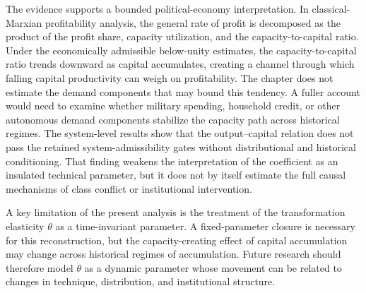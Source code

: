 \documentclass[11pt]{article}
\begin{document}
The evidence supports a bounded political-economy interpretation. In classical-Marxian profitability analysis, the general rate of profit is decomposed as the product of the profit share, capacity utilization, and the capacity-to-capital ratio. Under the economically admissible below-unity estimates, the capacity-to-capital ratio trends downward as capital accumulates, creating a channel through which falling capital productivity can weigh on profitability. The chapter does not estimate the demand components that may bound this tendency. A fuller account would need to examine whether military spending, household credit, or other autonomous demand components stabilize the capacity path across historical regimes. The system-level results show that the output--capital relation does not pass the retained system-admissibility gates without distributional and historical conditioning. That finding weakens the interpretation of the coefficient as an insulated technical parameter, but it does not by itself estimate the full causal mechanisms of class conflict or institutional intervention.

A key limitation of the present analysis is the treatment of the transformation elasticity $\theta$ as a time-invariant parameter. A fixed-parameter closure is necessary for this reconstruction, but the capacity-creating effect of capital accumulation may change across historical regimes of accumulation. Future research should therefore model $\theta$ as a dynamic parameter whose movement can be related to changes in technique, distribution, and institutional structure.

\pagebreak


\pagebreak
\appendix

\pagebreak

\end{document}
